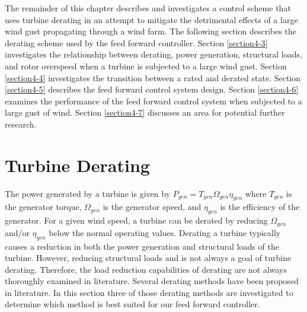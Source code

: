  The remainder of this chapter describes and investigates a control scheme that uses turbine derating in an attempt to mitigate the detrimental effects of a large wind gust propagating through a wind farm. The following section describes the derating scheme used by the feed forward controller. Section \ref{section4-3} investigates the relationship between derating, power generation, structural loads, and rotor overspeed when a turbine is subjected to a large wind gust. Section \ref{section4-4} investigates the transition between a rated and derated state. Section \ref{section4-5} describes the feed forward control system design. Section \ref{section4-6} examines the performance of the feed forward control system when subjected to a large gust of wind. Section \ref{section4-7} discusses an area for potential further research.



\section{Turbine Derating} \label{section4-2}

The power generated by a turbine is given by $P_{gen} = T_{gen}\Omega_{gen}\eta_{gen}$ where $T_{gen}$ is the generator torque, $\Omega_{gen}$ is the generator speed, and $\eta_{gen}$ is the efficiency of the generator. For a given wind speed, a turbine can be derated by reducing $\Omega_{gen}$ and/or $\eta_{gen}$ below the normal operating values. Derating a turbine typically causes a reduction in both the power generation and structural loads of the turbine. However, reducing structural loads and is not always a goal of turbine derating. Therefore, the load reduction capabilities of derating are not always thoroughly examined in literature. Several derating methods have been proposed in literature. In this section three of those derating methods are investigated to determine which method is best suited for our feed forward controller.

